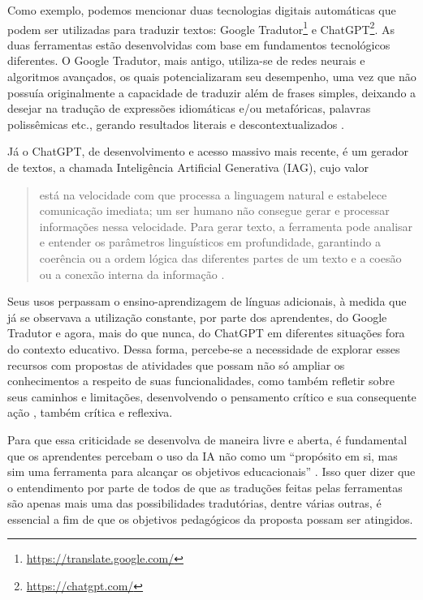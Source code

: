 \documentclass[portuguese]{textolivre}
\begin{document}
Como exemplo, podemos mencionar duas tecnologias digitais automáticas que podem ser utilizadas para traduzir textos: Google Tradutor\footnote{\url{https://translate.google.com/}} e ChatGPT\footnote{\url{https://chatgpt.com/}}. As duas ferramentas estão desenvolvidas com base em fundamentos tecnológicos diferentes. O Google Tradutor, mais antigo, utiliza-se de redes neurais e algoritmos avançados, os quais potencializaram seu desempenho, uma vez que não possuía originalmente a capacidade de traduzir além de frases simples, deixando a desejar na tradução de expressões idiomáticas e/ou metafóricas, palavras polissêmicas etc., gerando resultados literais e descontextualizados \cite{munozbasols2024}.

Já o ChatGPT, de desenvolvimento e acesso massivo mais recente, é um gerador de textos, a chamada Inteligência Artificial Generativa (IAG), cujo valor

\begin{quote}
    está na velocidade com que processa a linguagem natural e estabelece comunicação imediata; um ser humano não consegue gerar e processar informações nessa velocidade. Para gerar texto, a ferramenta pode analisar e entender os parâmetros linguísticos em profundidade, garantindo a coerência ou a ordem lógica das diferentes partes de um texto e a coesão ou a conexão interna da informação \cite[p. 346, tradução nossa]{munozbasols2024}.
\end{quote}

Seus usos perpassam o ensino-aprendizagem de línguas adicionais, à medida que já se observava a utilização constante, por parte dos aprendentes, do Google Tradutor e agora, mais do que nunca, do ChatGPT em diferentes situações fora do contexto educativo. Dessa forma, percebe-se a necessidade de explorar esses recursos com propostas de atividades que possam não só ampliar os conhecimentos a respeito de suas funcionalidades, como também refletir sobre seus caminhos e limitações, desenvolvendo o pensamento crítico e sua consequente ação \cite{buckingham2022}, também crítica e reflexiva.

Para que essa criticidade se desenvolva de maneira livre e aberta, é fundamental que os aprendentes percebam o uso da IA não como um “propósito em si, mas sim uma ferramenta para alcançar os objetivos educacionais” \cite[p. 33]{correia2024}. Isso quer dizer que o entendimento por parte de todos de que as traduções feitas pelas ferramentas são apenas mais uma das possibilidades tradutórias, dentre várias outras, é essencial a fim de que os objetivos pedagógicos da proposta possam ser atingidos.
\end{document}
